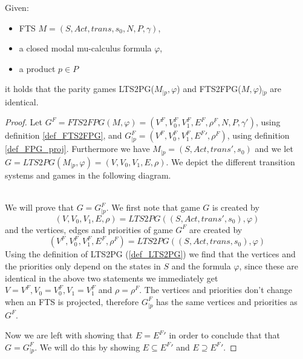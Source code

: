 \begin{theorem}
	\label{the_PGsubPGA} Given:
	\begin{itemize}
		\item FTS $M = (S,Act, trans, s_0, N, P, \gamma)$,
		\item a closed modal mu-calculus formula $\varphi$,
		\item a product $p \in P$
	\end{itemize}
	it holds that the parity games LTS2PG($M_{|p}, \varphi$) and FTS2FPG($M, \varphi$)$_{|p}$  are identical.
	\begin{proof}
		Let $G^F = FTS2FPG(M, \varphi) = (V^F, V_0^F, V_1^F, E^F, \rho^F, N, P, \gamma')$, using definition \ref{def_FTS2FPG}, and $G^F_{|p} = (V^F, V_0^F, V_1^F, {E^F}', \rho^F)$, using definition \ref{def_FPG_proj}. Furthermore we have $M_{|p} = (S, Act, trans', s_0)$ and we let $G =  LTS2PG(M_{|p}, \varphi) = (V, V_0, V_1, E, \rho)$. We depict the different transition systems and games in the following diagram.
		
		\\
		We will prove that $G = G_{|p}^F$. We first note that game $G$ is created by 
		\[  (V, V_0, V_1, E, \rho) = LTS2PG((S, Act, trans', s_0),\varphi) \]
		and the vertices, edges and priorities of game $G^F$ are created by 
		\[ (V^F, V_0^F, V_1^F, E^F, \rho^F) = LTS2PG((S,Act, trans, s_0), \varphi)\]
		Using the definition of LTS2PG (\ref{def_LTS2PG}) we find that the vertices and the priorities only depend on the states in $S$ and the formula $\varphi$, since these are identical in the above two statements we immediately get $V = V^F, V_0 = V_0^F, V_1 = V_1^F$ and $\rho = \rho^F$. The vertices and priorities don't change when an FTS is projected, therefore $G_{|p}^F$ has the same vertices and priorities as $G^F$.
		
		Now we are left with showing that $E = {E^F}'$ in order to conclude that that $G = G^F_{|p}$. We will do this by showing $E \subseteq {E^F}'$ and $E \supseteq {E^F}'$.
		

\end{proof}
\end{theorem}
